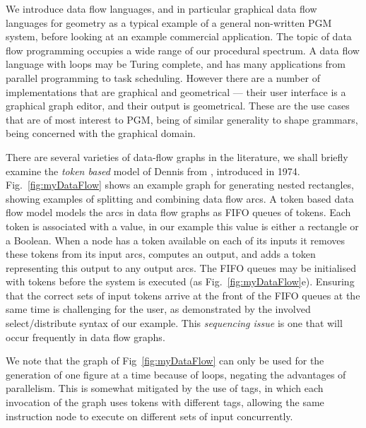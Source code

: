 We introduce data flow languages, and in particular graphical data flow languages for geometry as a typical example of a general non-written PGM system, before looking at an example commercial application. The topic of data flow programming occupies a wide range of our procedural spectrum. A data flow language with loops may be Turing complete, and has many applications from parallel programming to task scheduling. However there are a number of implementations that are graphical and geometrical --- their user interface is a graphical graph editor, and their output is geometrical. These are the use cases that are of most interest to PGM, being of similar generality to shape grammars, being concerned with the graphical domain. 

There are several varieties of data-flow graphs in the literature, we shall briefly examine the \emph{token based} model of Dennis from \cite{Dennis74}, introduced in 1974. Fig.~\ref{fig:myDataFlow} shows an example graph for generating nested rectangles, showing examples of splitting and combining data flow arcs. A token based data flow model models the arcs in data flow graphs as FIFO queues of tokens. Each token is associated with a value, in our example this value is either a rectangle or a Boolean. When a node has a token available on each of its inputs it removes these tokens from its input arcs, computes an output, and adds a token representing this output to any output arcs. The FIFO queues may be initialised with tokens before the system is executed (as Fig.~\ref{fig:myDataFlow}e). Ensuring that the correct sets of input tokens arrive at the front of the FIFO queues at the same time is challenging for the user, as demonstrated by the involved select/distribute syntax of our example. This \emph{sequencing issue} is one that will occur frequently in data flow graphs.

We note that the graph of Fig~\ref{fig:myDataFlow} can only be used for the generation of one figure at a time because of loops, negating the advantages of parallelism. This is somewhat mitigated by the use of tags\cite{Dennis74,Watson79}, in which each invocation of the graph uses tokens with different tags, allowing the same instruction node to execute on different sets of input concurrently.

